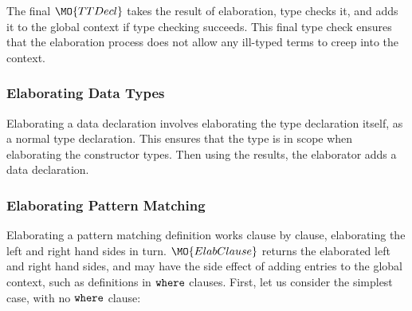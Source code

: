 
The final $\MO{TTDecl}$ takes the result of elaboration, type checks it,
and adds it to the global context if type checking succeeds. This final type check
ensures that the elaboration process does not allow any ill-typed terms to creep
into the context.

\subsubsection{Elaborating Data Types}

Elaborating a data declaration involves elaborating the type declaration itself,
as a normal type declaration. This ensures that the type is in scope when
elaborating the constructor types. Then using the results, the elaborator
adds a \TT{} data declaration.


\subsubsection{Elaborating Pattern Matching}

Elaborating a pattern matching definition works clause by clause, elaborating
the left and right hand sides in turn. $\MO{ElabClause}$ returns the elaborated
left and right hand sides, and may have the side effect of adding entries
to the global context, such as definitions in $\mathtt{where}$ clauses.
First, let us consider the simplest case, with no $\mathtt{where}$ clause:


